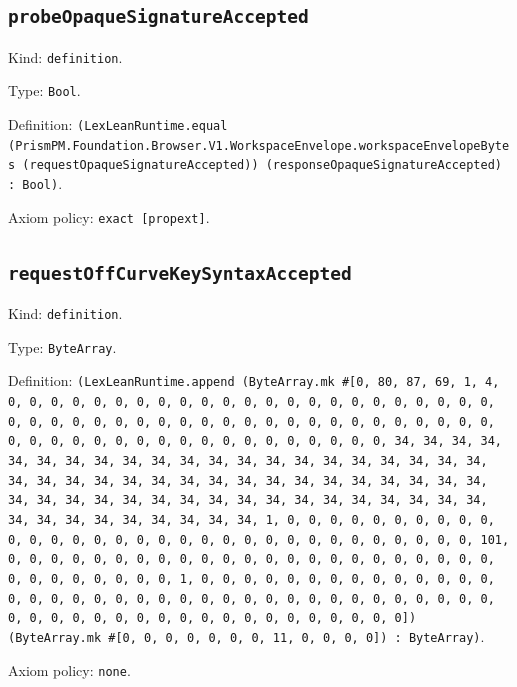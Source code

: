 \documentclass[11pt]{article}
\begin{document}
\subsection*{\texttt{probeOpaqueSignatureAccepted}}
\noindent Kind: \texttt{definition}.\par
\noindent Type: \texttt{Bool}.\par
\noindent Definition: \texttt{(LexLeanRuntime.equal (PrismPM.Foundation.Browser.V1.WorkspaceEnvelope.workspaceEnvelopeBytes (requestOpaqueSignatureAccepted)) (responseOpaqueSignatureAccepted) : Bool)}.\par
\noindent Axiom policy: \texttt{exact [propext]}.\par
\subsection*{\texttt{requestOffCurveKeySyntaxAccepted}}
\noindent Kind: \texttt{definition}.\par
\noindent Type: \texttt{ByteArray}.\par
\noindent Definition: \texttt{(LexLeanRuntime.append (ByteArray.mk \#[0, 80, 87, 69, 1, 4, 0, 0, 0, 0, 0, 0, 0, 0, 0, 0, 0, 0, 0, 0, 0, 0, 0, 0, 0, 0, 0, 0, 0, 0, 0, 0, 0, 0, 0, 0, 0, 0, 0, 0, 0, 0, 0, 0, 0, 0, 0, 0, 0, 0, 0, 0, 0, 0, 0, 0, 0, 0, 0, 0, 0, 0, 0, 0, 0, 0, 0, 0, 0, 0, 34, 34, 34, 34, 34, 34, 34, 34, 34, 34, 34, 34, 34, 34, 34, 34, 34, 34, 34, 34, 34, 34, 34, 34, 34, 34, 34, 34, 34, 34, 34, 34, 34, 34, 34, 34, 34, 34, 34, 34, 34, 34, 34, 34, 34, 34, 34, 34, 34, 34, 34, 34, 34, 34, 34, 34, 34, 34, 34, 34, 34, 34, 34, 34, 1, 0, 0, 0, 0, 0, 0, 0, 0, 0, 0, 0, 0, 0, 0, 0, 0, 0, 0, 0, 0, 0, 0, 0, 0, 0, 0, 0, 0, 0, 0, 0, 0, 101, 0, 0, 0, 0, 0, 0, 0, 0, 0, 0, 0, 0, 0, 0, 0, 0, 0, 0, 0, 0, 0, 0, 0, 0, 0, 0, 0, 0, 0, 0, 0, 1, 0, 0, 0, 0, 0, 0, 0, 0, 0, 0, 0, 0, 0, 0, 0, 0, 0, 0, 0, 0, 0, 0, 0, 0, 0, 0, 0, 0, 0, 0, 0, 0, 0, 0, 0, 0, 0, 0, 0, 0, 0, 0, 0, 0, 0, 0, 0, 0, 0, 0, 0, 0, 0, 0, 0, 0]) (ByteArray.mk \#[0, 0, 0, 0, 0, 0, 0, 11, 0, 0, 0, 0]) : ByteArray)}.\par
\noindent Axiom policy: \texttt{none}.\par
\end{document}
